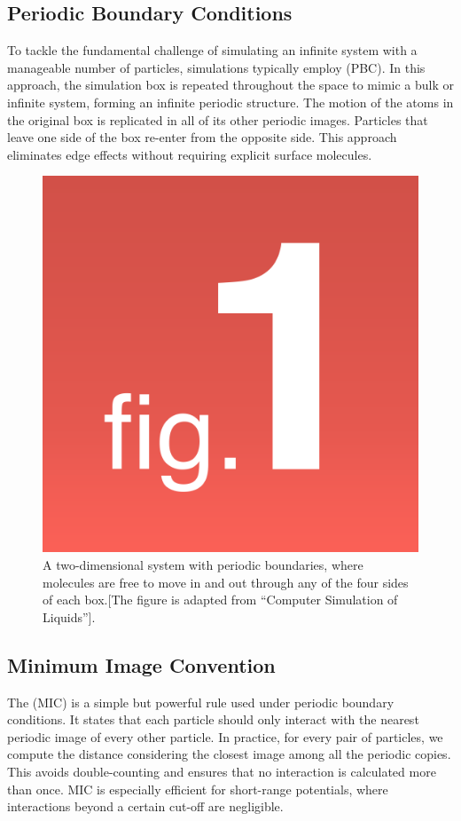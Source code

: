 \subsection{Periodic Boundary Conditions}
To tackle the fundamental challenge of simulating an infinite system with a manageable number of particles, simulations typically employ  (\acs{PBC}). In this approach, the simulation box is repeated throughout the space to mimic a bulk or infinite system, forming an infinite periodic structure. The motion of the atoms in the original box is replicated in all of its other periodic images. Particles that leave one side of the box re-enter from the opposite side. This approach eliminates edge effects without requiring explicit surface molecules.
\begin{figure}
    \centering
    \includegraphics[width=0.75\linewidth]{images/Figure 1.png}
    \caption{A two-dimensional system with periodic boundaries, where molecules are free to move in and out through any of the four sides of each box.[The figure is
 adapted from “Computer Simulation of Liquids”]\cite{simulation_of_liq}.}
    \label{fig:periodic}
\end{figure}
\subsection{Minimum Image Convention}
The  (\acs{MIC})\cite{minimumimage,hloucha1998fast} is a simple but powerful rule used under periodic boundary conditions. It states that each particle should only interact with the nearest periodic image of every other particle. In practice, for every pair of particles, we compute the distance considering the closest image among all the periodic copies. This avoids double-counting and ensures that no interaction is calculated more than once. MIC is especially efficient for short-range potentials, where interactions beyond a certain cut-off are negligible. 

